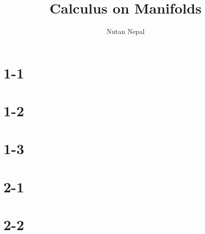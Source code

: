 
\title{Calculus on Manifolds}
\author{Nutan Nepal}



\maketitle
    \section{1-1}
    \section{1-2}
        
    \section{1-3}
        
        
        \begin{questions}
            
            
            
            
            
        \end{questions}
    \section{2-1}
        \begin{questions}
            
            
            
            
        \end{questions}
    \section{2-2}
        
        \begin{questions}
            
            
        \end{questions}
